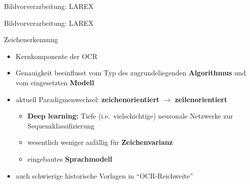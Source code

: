 \documentclass{bbawslides}
\begin{document}
\begin{bbawslide}{Bildvorverarbeitung: LAREX}
  \vspace*{2mm}%
  \begin{center}
  \end{center}
\end{bbawslide}

\begin{bbawslide}{Bildvorverarbeitung: LAREX}
  \vspace*{2mm}%
  \begin{center}
  \end{center}
\end{bbawslide}

\begin{bbawslide}{Zeichenerkennung}
  \vspace*{7mm}%
  \centerslidestrue%
  \begin{itemize}
    \item Kernkomponente der OCR
    \item Genauigkeit beeinflusst vom Typ des zugrundeliegenden \textbf{Algorithmus} und vom eingesetzten \textbf{Modell}
    \item aktuell Paradigmenwechsel: \textbf{zeichenorientiert} $\rightarrow$ \textbf{zeilenorientiert}
    \begin{itemize} \small
      \item \textbf{Deep learning:} Tiefe (i.e.~vielschichtige) neuronale Netzwerke zur Sequenzklassifizierung 
      \item wesentlich weniger anfällig für \textbf{Zeichenvarianz}
      \item eingebautes \textbf{Sprachmodell}
    \end{itemize}
    \item auch schwierige historische Vorlagen in \enquote{OCR-Reichweite} 
  \end{itemize}
\end{bbawslide}
\end{document}
